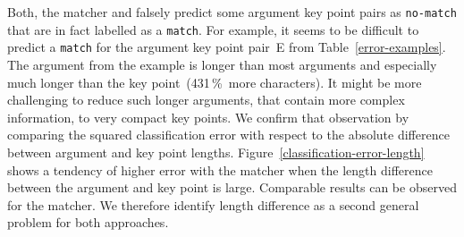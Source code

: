 Both, the \BertBase matcher and \RobertaBase falsely predict some argument key point pairs as \texttt{no-match} that are in 
fact labelled as a \texttt{match}.
For example, it seems to be difficult to predict a \texttt{match} for the argument key point pair~E from Table~\ref{error-examples}.
The argument from the example is longer than most arguments and especially much longer than the key point~(431\,\%~more characters).
It might be more challenging to reduce such longer arguments, that contain more complex information, to very compact key points.
We confirm that observation by comparing the squared classification error with respect to the absolute difference between 
argument and key point lengths.
Figure~\ref{classification-error-length} shows a tendency of higher error with the \BertBase matcher when the length difference 
between the argument and key point is large.
Comparable results can be observed for the \RobertaBase matcher.
We therefore identify length difference as a second general problem for both approaches.
